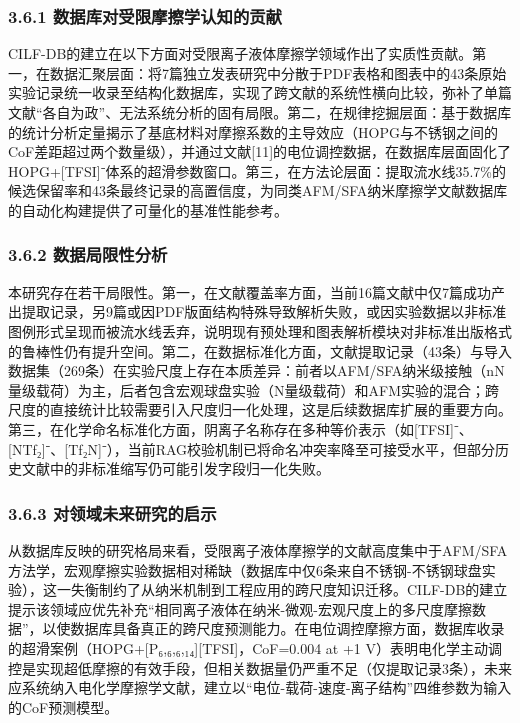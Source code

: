 \hypertarget{ux6570ux636eux5e93ux5bf9ux53d7ux9650ux6469ux64e6ux5b66ux8ba4ux77e5ux7684ux8d21ux732e}{%
\subsubsection{3.6.1 数据库对受限摩擦学认知的贡献}\label{ux6570ux636eux5e93ux5bf9ux53d7ux9650ux6469ux64e6ux5b66ux8ba4ux77e5ux7684ux8d21ux732e}}

CILF-DB的建立在以下方面对受限离子液体摩擦学领域作出了实质性贡献。第一，在数据汇聚层面：将7篇独立发表研究中分散于PDF表格和图表中的43条原始实验记录统一收录至结构化数据库，实现了跨文献的系统性横向比较，弥补了单篇文献``各自为政''、无法系统分析的固有局限。第二，在规律挖掘层面：基于数据库的统计分析定量揭示了基底材料对摩擦系数的主导效应（HOPG与不锈钢之间的CoF差距超过两个数量级），并通过文献{[}11{]}的电位调控数据，在数据库层面固化了HOPG+{[}TFSI{]}⁻体系的超滑参数窗口。第三，在方法论层面：提取流水线35.7\%的候选保留率和43条最终记录的高置信度，为同类AFM/SFA纳米摩擦学文献数据库的自动化构建提供了可量化的基准性能参考。

\hypertarget{ux6570ux636eux5c40ux9650ux6027ux5206ux6790}{%
\subsubsection{3.6.2 数据局限性分析}\label{ux6570ux636eux5c40ux9650ux6027ux5206ux6790}}

本研究存在若干局限性。第一，在文献覆盖率方面，当前16篇文献中仅7篇成功产出提取记录，另9篇或因PDF版面结构特殊导致解析失败，或因实验数据以非标准图例形式呈现而被流水线丢弃，说明现有预处理和图表解析模块对非标准出版格式的鲁棒性仍有提升空间。第二，在数据标准化方面，文献提取记录（43条）与导入数据集（269条）在实验尺度上存在本质差异：前者以AFM/SFA纳米级接触（nN量级载荷）为主，后者包含宏观球盘实验（N量级载荷）和AFM实验的混合；跨尺度的直接统计比较需要引入尺度归一化处理，这是后续数据库扩展的重要方向。第三，在化学命名标准化方面，阴离子名称存在多种等价表示（如{[}TFSI{]}⁻、{[}NTf₂{]}⁻、{[}Tf₂N{]}⁻），当前RAG校验机制已将命名冲突率降至可接受水平，但部分历史文献中的非标准缩写仍可能引发字段归一化失败。

\hypertarget{ux5bf9ux9886ux57dfux672aux6765ux7814ux7a76ux7684ux542fux793a}{%
\subsubsection{3.6.3 对领域未来研究的启示}\label{ux5bf9ux9886ux57dfux672aux6765ux7814ux7a76ux7684ux542fux793a}}

从数据库反映的研究格局来看，受限离子液体摩擦学的文献高度集中于AFM/SFA方法学，宏观摩擦实验数据相对稀缺（数据库中仅6条来自不锈钢-不锈钢球盘实验），这一失衡制约了从纳米机制到工程应用的跨尺度知识迁移。CILF-DB的建立提示该领域应优先补充``相同离子液体在纳米-微观-宏观尺度上的多尺度摩擦数据''，以使数据库具备真正的跨尺度预测能力。在电位调控摩擦方面，数据库收录的超滑案例（HOPG+{[}P₆,₆,₆,₁₄{]}{[}TFSI{]}，CoF=0.004 at +1 V）表明电化学主动调控是实现超低摩擦的有效手段，但相关数据量仍严重不足（仅提取记录3条），未来应系统纳入电化学摩擦学文献，建立以``电位-载荷-速度-离子结构''四维参数为输入的CoF预测模型。

